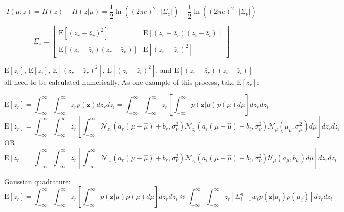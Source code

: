 \documentclass{article}         %
\theoremstyle{definition}
\theoremstyle{remark}
\newcommand{\eq}[1]{\begin{equation} #1 \end{equation}}
\newcommand{\zbf}{\mathbf{z}}
\newcommand{\zcond}{\mathbf{z}|\mu}
\newcommand{\Nscript}{\mathcal{N}}
\newcommand{\paren}[1]{\left(#1\right)}
\newcommand{\bracket}[1]{\left[#1\right]}
\newcommand{\expect}[1]{\mathrm{E}\left[#1\right]}
\begin{document}
\begin{equation}
	I\left(\mu;z\right) = H\left(z\right) - H\left(z|\mu\right) 
	= \frac{1}{2}\ln\left(\left(2\pi e\right)^2\cdot\lvert\Sigma_z\rvert\right) - \frac{1}{2}\ln\left(\left(2\pi e\right)^2\cdot\lvert\Sigma_\nu\rvert\right)
\end{equation}

\begin{equation}
	\Sigma_z = \left[ \begin{array}{cc}
	\mathrm{E}\left[\left(z_r - \bar{z}_r\right)^2\right] & \mathrm{E}\left[\left(z_r - \bar{z}_r\right)\left(z_i - \bar{z}_i\right)\right] \\
	\mathrm{E}\left[\left(z_i - \bar{z}_i\right)\left(z_r - \bar{z}_r\right)\right] & \mathrm{E}\left[\left(z_r - \bar{z}_r\right)^2\right] \end{array} \right]
\end{equation}

$\expect{z_r}$, $\expect{z_i}$, $\expect{\left(z_r - \bar{z}_r\right)^2}$, $\expect{\left(z_i - \bar{z}_i\right)^2}$, and $\expect{\left(z_r - \bar{z}_r\right)\left(z_i - \bar{z}_i\right)}$ all need to be calculated numerically. As one example of this process, take $\expect{z_r}$:

\eq{\expect{z_r} = \int_{-\infty}^\infty\int_{-\infty}^\infty z_r p\paren{\zbf}dz_rdz_i = \int_{-\infty}^\infty\int_{-\infty}^\infty z_r \bracket{\int_{-\infty}^\infty p\paren{\zcond}p\paren{\mu}d\mu}dz_rdz_i}
\eq{\expect{z_r} = \int_{-\infty}^\infty\int_{-\infty}^\infty z_r \bracket{\int_{-\infty}^\infty \Nscript_{z_r}\paren{a_r\paren{\mu - \hat{\mu}} + b_r,\sigma_\nu^2}\Nscript_{z_i}\paren{a_i\paren{\mu - \hat{\mu}} + b_i,\sigma_\nu^2}\Nscript_\mu\paren{\mu_\mu,\sigma_\mu^2} d\mu}dz_rdz_i}
OR
\eq{\expect{z_r} = \int_{-\infty}^\infty\int_{-\infty}^\infty z_r \bracket{\int_{-\infty}^\infty \Nscript_{z_r}\paren{a_r\paren{\mu - \hat{\mu}} + b_r,\sigma_\nu^2}\Nscript_{z_i}\paren{a_i\paren{\mu - \hat{\mu}} + b_i,\sigma_\nu^2}\mathcal{U}_\mu\paren{a_\mu,b_\mu} d\mu}dz_rdz_i}

Gaussian quadrature:
\eq{\expect{z_r} = \int_{-\infty}^\infty\int_{-\infty}^\infty z_r \bracket{\int_{-\infty}^\infty p\paren{\zcond}p\paren{\mu}d\mu}dz_rdz_i \approx \int_{-\infty}^\infty\int_{-\infty}^\infty z_r \bracket{\Sigma_{i=1}^n w_i p\paren{\zbf|\mu_i}p\paren{\mu_i}}dz_rdz_i} 
\end{document}
